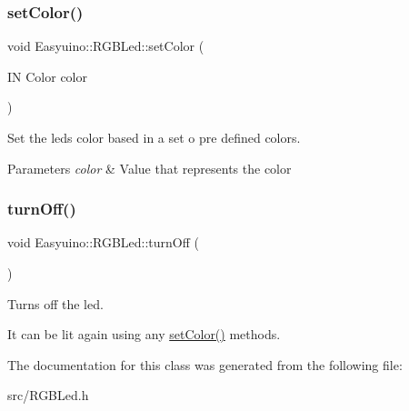 \subsubsection{\texorpdfstring{set\+Color()}{setColor()}\hspace{0.1cm}{\footnotesize\ttfamily [3/3]}}
{\footnotesize\ttfamily void Easyuino\+::\+R\+G\+B\+Led\+::set\+Color (\begin{DoxyParamCaption}\item[{IN Color}]{color }\end{DoxyParamCaption})}



Set the led\textquotesingle{}s color based in a set o pre defined colors. 


\begin{DoxyParams}{Parameters}
{\em color} & Value that represents the color \\
\hline
\end{DoxyParams}
\mbox{\label{class_easyuino_1_1_r_g_b_led_a100140fa6d32e190f68cdc1e24c3aba0}} 
\subsubsection{\texorpdfstring{turn\+Off()}{turnOff()}}
{\footnotesize\ttfamily void Easyuino\+::\+R\+G\+B\+Led\+::turn\+Off (\begin{DoxyParamCaption}{ }\end{DoxyParamCaption})}



Turns off the led. 

It can be lit again using any \hyperlink{class_easyuino_1_1_r_g_b_led_a4c113ab3fbbd2a75f020a902355faa3e}{set\+Color()} methods. 

The documentation for this class was generated from the following file\+:\begin{DoxyCompactItemize}
\item 
src/R\+G\+B\+Led.\+h\end{DoxyCompactItemize}
